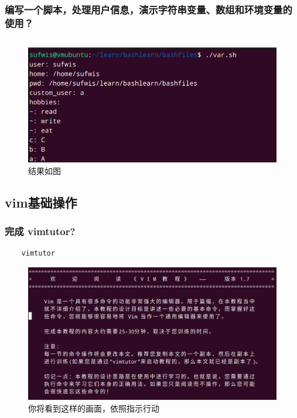 \documentclass[UTF8]{ctexart}
\begin{document}
\subsubsection{编写一个脚本，处理用户信息，演示字符串变量、数组和环境变量的使用？}
\begin{lstlisting}

\end{lstlisting}
\begin{figure}[H]
	\centering
	\includegraphics[width=0.7\linewidth]{figures/array.png}
	\caption{结果如图}
\end{figure}

\subsection{vim基础操作}
\subsubsection{完成 vimtutor?}
\begin{lstlisting}
	vimtutor
\end{lstlisting}
\begin{figure}[H]
	\centering
	\includegraphics[width=0.7\linewidth]{figures/vimtutor.png}
	\caption{你将看到这样的画面，依照指示行动}
\end{figure}
\end{document}

